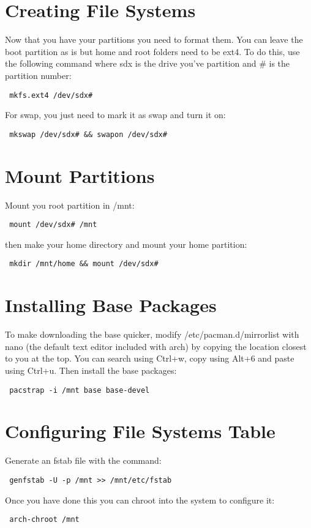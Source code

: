 \documentclass[12pt]{article}
\begin{document}
\section*{Creating File Systems}
    Now that you have your partitions you need to format them. You can leave
    the boot partition as is but home and root folders need to be ext4. To do
    this, use the following command where sdx is the drive you've partition and
    \# is the partition number:
    \begin{verbatim} mkfs.ext4 /dev/sdx# \end{verbatim}
    For swap, you just need to mark it as swap and turn it on:
    \begin{verbatim} mkswap /dev/sdx# && swapon /dev/sdx# \end{verbatim}

\section*{Mount Partitions}
    Mount you root partition in /mnt:
    \begin{verbatim} mount /dev/sdx# /mnt \end{verbatim}
    then make your home directory and mount your home partition:
    \begin{verbatim} mkdir /mnt/home && mount /dev/sdx# \end{verbatim}

\section*{Installing Base Packages}
    To make downloading the base quicker, modify /etc/pacman.d/mirrorlist with
    nano (the default text editor included with arch) by copying the location
    closest to you at the top. You can search using Ctrl+w, copy using Alt+6
    and paste using Ctrl+u. Then install the base packages:
    \begin{verbatim} pacstrap -i /mnt base base-devel \end{verbatim}

\section*{Configuring File Systems Table}
    Generate an fstab file with the command:
    \begin{verbatim} genfstab -U -p /mnt >> /mnt/etc/fstab \end{verbatim}
    Once you have done this you can chroot into the system to configure it:
    \begin{verbatim} arch-chroot /mnt \end{verbatim}
\end{document}
